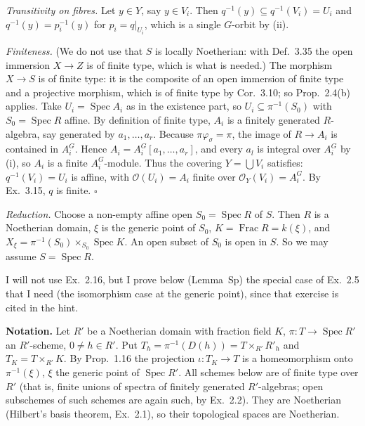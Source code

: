 \documentclass[11pt]{article}
\begin{document}
\emph{Transitivity on fibres.} Let $y\in Y$, say $y\in V_i$. Then $q^{-1}(y)\subseteq q^{-1}(V_i)=U_i$ and $q^{-1}(y)=p_i^{-1}(y)$ for $p_i=q|_{U_i}$, which is a single $G$-orbit by (ii).

\emph{Finiteness.} (We do not use that $S$ is locally Noetherian: with Def.~3.35 the open immersion $X\to Z$ is of finite type, which is what is needed.) The morphism $X\to S$ is of finite type: it is the composite of an open immersion of finite type and a projective morphism, which is of finite type by Cor.~3.10; so Prop.~2.4(b) applies. Take $U_i=\operatorname{Spec}A_i$ as in the existence part, so $U_i\subseteq\pi^{-1}(S_0)$ with $S_0=\operatorname{Spec}R$ affine. By definition of finite type, $A_i$ is a finitely generated $R$-algebra, say generated by $a_1,\dots,a_r$. Because $\pi\varphi_\sigma=\pi$, the image of $R\to A_i$ is contained in $A_i^G$. Hence $A_i=A_i^G[a_1,\dots,a_r]$, and every $a_l$ is integral over $A_i^G$ by (i), so $A_i$ is a finite $A_i^G$-module. Thus the covering $Y=\bigcup V_i$ satisfies: $q^{-1}(V_i)=U_i$ is affine, with $\mathcal{O}(U_i)=A_i$ finite over $\mathcal{O}_Y(V_i)=A_i^G$. By Ex.~3.15, $q$ is finite. \hfill$\square$

\pf
\emph{Reduction.} Choose a non-empty affine open $S_0=\operatorname{Spec}R$ of $S$. Then $R$ is a Noetherian domain, $\xi$ is the generic point of $S_0$, $K=\operatorname{Frac}R=k(\xi)$, and $X_\xi=\pi^{-1}(S_0)\times_{S_0}\operatorname{Spec}K$. An open subset of $S_0$ is open in $S$. So we may assume $S=\operatorname{Spec}R$.

I will not use Ex.~2.16, but I prove below (Lemma~Sp) the special case of Ex.~2.5 that I need (the isomorphism case at the generic point), since that exercise is cited in the hint.

\textbf{Notation.} Let $R'$ be a Noetherian domain with fraction field $K$, $\pi:T\to\operatorname{Spec}R'$ an $R'$-scheme, $0\neq h\in R'$. Put $T_h=\pi^{-1}(D(h))=T\times_{R'}R'_h$ and $T_K=T\times_{R'}K$. By Prop.~1.16 the projection $\iota:T_K\to T$ is a homeomorphism onto $\pi^{-1}(\xi)$, $\xi$ the generic point of $\operatorname{Spec}R'$. All schemes below are of finite type over $R'$ (that is, finite unions of spectra of finitely generated $R'$-algebras; open subschemes of such schemes are again such, by Ex.~2.2). They are Noetherian (Hilbert's basis theorem, Ex.~2.1), so their topological spaces are Noetherian.
\end{document}
